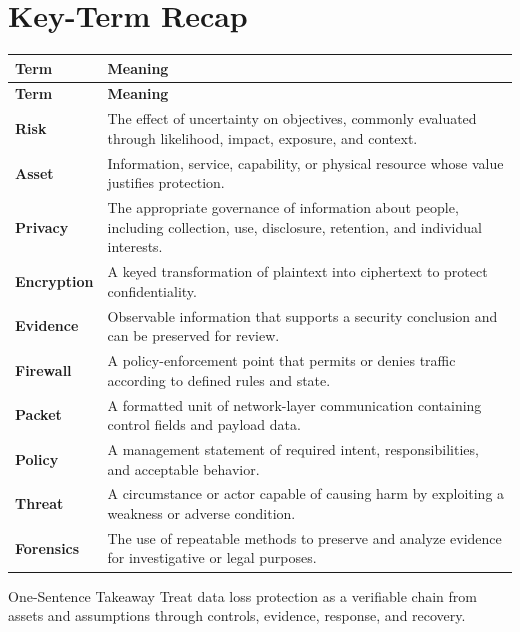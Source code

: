 \documentclass[11pt,letterpaper]{article}
\begin{document}
\section*{Key-Term Recap}
\begin{longtable}{>{\raggedright\arraybackslash}p{}>{\raggedright\arraybackslash}p{}}
\toprule\rowcolor{Navy}\color{white}\textbf{Term} & \color{white}\textbf{Meaning}\\\midrule
\endfirsthead
\toprule\rowcolor{Navy}\color{white}\textbf{Term} & \color{white}\textbf{Meaning}\\\midrule
\endhead
\textbf{Risk} & The effect of uncertainty on objectives, commonly evaluated through likelihood, impact, exposure, and context. \\\midrule
\textbf{Asset} & Information, service, capability, or physical resource whose value justifies protection. \\\midrule
\textbf{Privacy} & The appropriate governance of information about people, including collection, use, disclosure, retention, and individual interests. \\\midrule
\textbf{Encryption} & A keyed transformation of plaintext into ciphertext to protect confidentiality. \\\midrule
\textbf{Evidence} & Observable information that supports a security conclusion and can be preserved for review. \\\midrule
\textbf{Firewall} & A policy-enforcement point that permits or denies traffic according to defined rules and state. \\\midrule
\textbf{Packet} & A formatted unit of network-layer communication containing control fields and payload data. \\\midrule
\textbf{Policy} & A management statement of required intent, responsibilities, and acceptable behavior. \\\midrule
\textbf{Threat} & A circumstance or actor capable of causing harm by exploiting a weakness or adverse condition. \\\midrule
\textbf{Forensics} & The use of repeatable methods to preserve and analyze evidence for investigative or legal purposes. \\\midrule
\bottomrule
\end{longtable}
\begin{CornellExamBox}{One-Sentence Takeaway}
Treat data loss protection as a verifiable chain from assets and assumptions through controls, evidence, response, and recovery.
\end{CornellExamBox}
\end{document}
